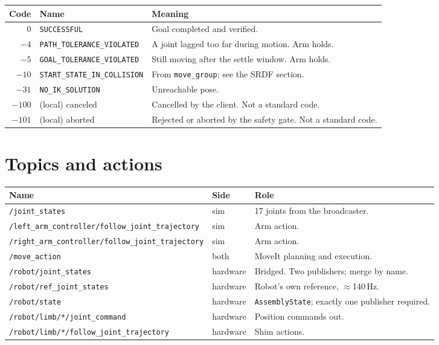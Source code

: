 \begin{table}[h]
\centering
\small
\begin{tabularx}{\linewidth}{@{}rlX@{}}
\toprule
\textbf{Code} & \textbf{Name} & \textbf{Meaning} \\
\midrule
$0$    & \texttt{SUCCESSFUL} & Goal completed and verified. \\
$-4$   & \texttt{PATH\_TOLERANCE\_VIOLATED} & A joint lagged too far during motion. Arm holds. \\
$-5$   & \texttt{GOAL\_TOLERANCE\_VIOLATED} & Still moving after the settle window. Arm holds. \\
$-10$  & \texttt{START\_STATE\_IN\_COLLISION} & From \texttt{move\_group}; see the SRDF section. \\
$-31$  & \texttt{NO\_IK\_SOLUTION} & Unreachable pose. \\
$-100$ & (local) canceled & Cancelled by the client. Not a standard code. \\
$-101$ & (local) aborted & Rejected or aborted by the safety gate. Not a standard code. \\
\bottomrule
\end{tabularx}
\end{table}

\section{Topics and actions}

\begin{table}[h]
\centering
\small
\begin{tabularx}{\linewidth}{@{}llX@{}}
\toprule
\textbf{Name} & \textbf{Side} & \textbf{Role} \\
\midrule
\texttt{/joint\_states} & sim & 17 joints from the broadcaster. \\
\texttt{/left\_arm\_controller/follow\_joint\_trajectory} & sim & Arm action. \\
\texttt{/right\_arm\_controller/follow\_joint\_trajectory} & sim & Arm action. \\
\texttt{/move\_action} & both & MoveIt planning and execution. \\
\texttt{/robot/joint\_states} & hardware & Bridged. Two publishers; merge by name. \\
\texttt{/robot/ref\_joint\_states} & hardware & Robot's own reference, $\approx$140\,Hz. \\
\texttt{/robot/state} & hardware & \texttt{AssemblyState}; exactly one publisher required. \\
\texttt{/robot/limb/*/joint\_command} & hardware & Position commands out. \\
\texttt{/robot/limb/*/follow\_joint\_trajectory} & hardware & Shim actions. \\
\bottomrule
\end{tabularx}
\end{table}

